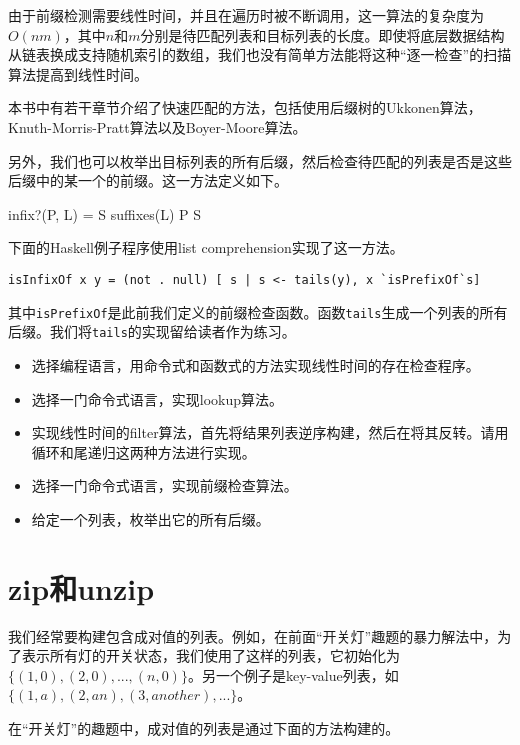 \documentclass[UTF8]{article}
\begin{document}
由于前缀检测需要线性时间，并且在遍历时被不断调用，这一算法的复杂度为$O(nm)$，其中$n$和$m$分别是待匹配列表和目标列表的长度。即使将底层数据结构从链表换成支持随机索引的数组，我们也没有简单方法能将这种“逐一检查”的扫描算法提高到线性时间。

本书中有若干章节介绍了快速匹配的方法，包括使用后缀树的Ukkonen算法，Knuth-Morris-Pratt算法以及Boyer-Moore算法。

另外，我们也可以枚举出目标列表的所有后缀，然后检查待匹配的列表是否是这些后缀中的某一个的前缀。这一方法定义如下。

\be
infix?(P, L) = \exists S \in suffixes(L) \land P \subseteq S
\ee

下面的Haskell例子程序使用list comprehension实现了这一方法。

\lstset{language=Haskell}
\begin{lstlisting}[style=Haskell]
isInfixOf x y = (not . null) [ s | s <- tails(y), x `isPrefixOf`s]
\end{lstlisting}

其中\texttt{isPrefixOf}是此前我们定义的前缀检查函数。函数\texttt{tails}生成一个列表的所有后缀。我们将\texttt{tails}的实现留给读者作为练习。

\begin{Exercise}
\begin{itemize}
\item 选择编程语言，用命令式和函数式的方法实现线性时间的存在检查程序。
\item 选择一门命令式语言，实现lookup算法。
\item 实现线性时间的filter算法，首先将结果列表逆序构建，然后在将其反转。请用循环和尾递归这两种方法进行实现。
\item 选择一门命令式语言，实现前缀检查算法。
\item 给定一个列表，枚举出它的所有后缀。
\end{itemize}
\end{Exercise}

\section{zip和unzip}

我们经常要构建包含成对值的列表。例如，在前面“开关灯”趣题的暴力解法中，为了表示所有灯的开关状态，我们使用了这样的列表，它初始化为$\{(1, 0), (2, 0), ..., (n, 0)\}$。另一个例子是key-value列表，如$\{(1, a), (2, an), (3, another), ... \}$。

在“开关灯”的趣题中，成对值的列表是通过下面的方法构建的。
\end{document}
